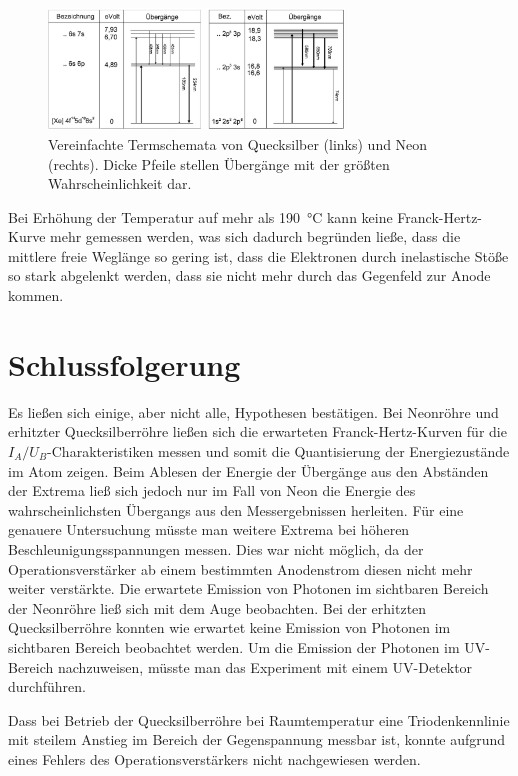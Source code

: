 \documentclass[
	a4paper,
	12pt,
	pagesize,
	ngerman
]{scrartcl}
\begin{document}
	\begin{figure}[H]
		\includegraphics[width=0.7\textwidth]{Term}
		\centering
		\caption{Vereinfachte Termschemata von Quecksilber (links) und Neon
			(rechts). Dicke Pfeile stellen Übergänge mit der größten Wahrscheinlichkeit
			dar.\cite{Roehren} }
		\label{Term}
		\centering
	\end{figure}
	
	Bei Erhöhung der Temperatur auf mehr als \SI{190}{\degreeCelsius} kann keine Franck-Hertz-Kurve mehr gemessen werden, was sich dadurch begründen ließe, dass die mittlere freie Weglänge so gering ist, dass die Elektronen durch inelastische Stöße so stark abgelenkt werden, dass sie nicht mehr durch das Gegenfeld zur Anode kommen.
	
	
	\section{Schlussfolgerung}
	Es ließen sich einige, aber nicht alle, Hypothesen bestätigen.
	Bei Neonröhre und erhitzter Quecksilberröhre ließen sich die erwarteten Franck-Hertz-Kurven für die $I_A/U_B$-Charakteristiken messen und somit die Quantisierung der Energiezustände im Atom zeigen.
	Beim Ablesen der Energie der Übergänge aus den Abständen der Extrema ließ sich jedoch nur im Fall von Neon die Energie des wahrscheinlichsten Übergangs aus den Messergebnissen herleiten.
	Für eine genauere Untersuchung müsste man weitere Extrema bei höheren Beschleunigungsspannungen messen.
	Dies war nicht möglich, da der Operationsverstärker ab einem bestimmten Anodenstrom diesen nicht mehr weiter verstärkte.
	Die erwartete Emission von Photonen im sichtbaren Bereich der Neonröhre ließ sich mit dem Auge beobachten.
	Bei der erhitzten Quecksilberröhre konnten wie erwartet keine Emission von Photonen im sichtbaren Bereich beobachtet werden.
	Um die Emission der Photonen im UV-Bereich nachzuweisen, müsste man das Experiment mit einem UV-Detektor durchführen.
	
	Dass bei Betrieb der Quecksilberröhre bei Raumtemperatur eine Triodenkennlinie mit steilem Anstieg im Bereich der Gegenspannung messbar ist, konnte aufgrund eines Fehlers des Operationsverstärkers nicht nachgewiesen werden.
	
\end{document}
